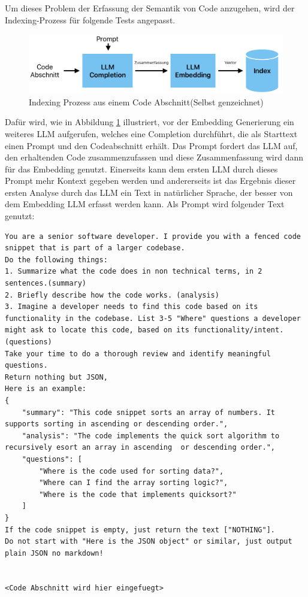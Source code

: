 \documentclass[../main.tex]{subfiles}
\begin{document}
Um dieses Problem der Erfassung der Semantik von Code anzugehen, wird der Indexing-Prozess für folgende Tests angepasst.

\begin{figure}[H]
    \centering
    \includegraphics[scale=.6]{"bilder/prozess.png"}
    \caption{Indexing Prozess aus einem Code Abschnitt(Selbst genzeichnet)}
    \label{fig:indexing}
\end{figure}
Dafür wird, wie in Abbildung \ref{fig:indexing} illustriert, vor der Embedding Generierung ein weiteres \gls{LLM} aufgerufen, welches eine Completion durchführt, die als Starttext einen Prompt und den Codeabschnitt erhält.
Das Prompt fordert das \gls{LLM} auf, den erhaltenden Code zusammenzufassen und diese Zusammenfassung wird dann für das Embedding genutzt.
Einerseits kann dem ersten \gls{LLM} durch dieses Prompt mehr Kontext gegeben werden und andererseits ist das Ergebnis dieser ersten Analyse durch das \gls{LLM} ein Text in natürlicher Sprache, der besser von dem Embedding \gls{LLM} erfasst werden kann.
Als Prompt wird folgender Text genutzt:

\begin{lstlisting}
You are a senior software developer. I provide you with a fenced code snippet that is part of a larger codebase.
Do the following things:
1. Summarize what the code does in non technical terms, in 2 sentences.(summary)
2. Briefly describe how the code works. (analysis)
3. Imagine a developer needs to find this code based on its functionality in the codebase. List 3-5 "Where" questions a developer might ask to locate this code, based on its functionality/intent. (questions)
Take your time to do a thorough review and identify meaningful questions.
Return nothing but JSON,
Here is an example:
{
    "summary": "This code snippet sorts an array of numbers. It supports sorting in ascending or descending order.", 
    "analysis": "The code implements the quick sort algorithm to recursively esort an array in ascending  or descending order.",
    "questions": [
        "Where is the code used for sorting data?",
        "Where can I find the array sorting logic?",
        "Where is the code that implements quicksort?"
    ]
}
If the code snippet is empty, just return the text ["NOTHING"].
Do not start with "Here is the JSON object" or similar, just output plain JSON no markdown!


<Code Abschnitt wird hier eingefuegt>
\end{lstlisting}
\end{document}
